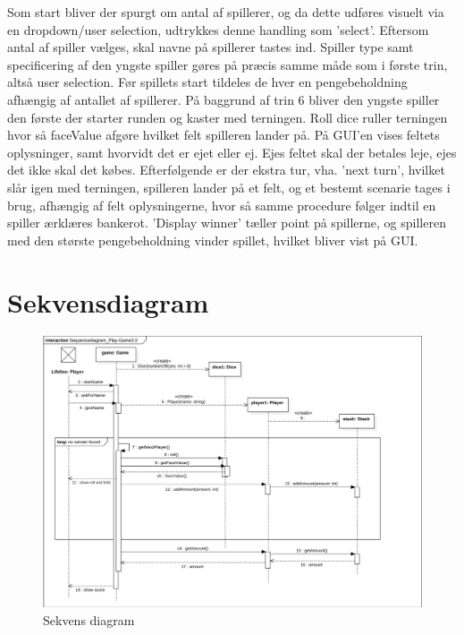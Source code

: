 \noindent Som start bliver der spurgt om antal af spillerer, og da dette udføres visuelt via en dropdown/user selection, udtrykkes denne handling som 'select'.
Eftersom antal af spiller vælges, skal navne på spillerer tastes ind.
Spiller type samt specificering af den yngste spiller gøres på præcis samme måde som i første trin, altså user selection.
Før spillets start tildeles de hver en pengebeholdning afhængig af antallet af spillerer.
På baggrund af trin 6 bliver den yngste spiller den første der starter runden og kaster med terningen.
Roll dice ruller terningen hvor så faceValue afgøre hvilket felt spilleren lander på.
På GUI'en vises feltets oplysninger, samt hvorvidt det er ejet eller ej. Ejes feltet skal der betales leje, ejes det ikke skal det købes.
Efterfølgende er der ekstra tur, vha. 'next turn', hvilket slår igen med terningen, spilleren lander på et felt, og et bestemt scenarie tages i brug, afhængig af felt oplysningerne, hvor så samme procedure følger indtil en spiller ærklæres bankerot.
'Display winner' tæller point på spillerne, og spilleren med den største pengebeholdning vinder spillet, hvilket bliver vist på GUI.\\

\section{Sekvensdiagram}
\begin{figure}[H]
    \begin{center}
        \includegraphics[width=\columnwidth]{graphics/domain/SD_Game3.png}
        \caption{Sekvens diagram}
        \label{fig:sekvens_diagram}
    \end{center}
\end{figure}